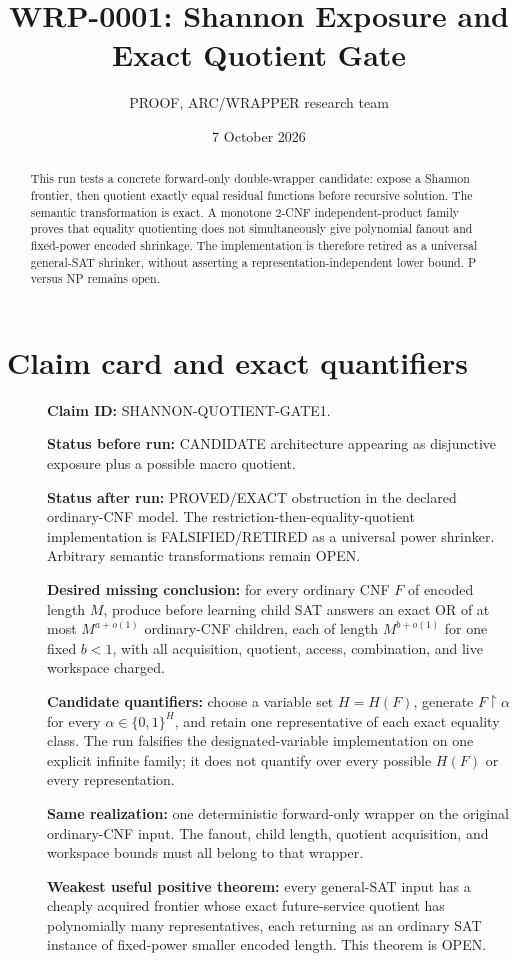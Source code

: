 \documentclass[11pt]{article}
\title{WRP-0001: Shannon Exposure and Exact Quotient Gate}
\author{PROOF, ARC/WRAPPER research team}
\date{7 October 2026}
\begin{document}
\maketitle

\begin{abstract}
This run tests a concrete forward-only double-wrapper candidate: expose a
Shannon frontier, then quotient exactly equal residual functions before
recursive solution.  The semantic transformation is exact.  A monotone
2-CNF independent-product family proves that equality quotienting does not
simultaneously give polynomial fanout and fixed-power encoded shrinkage.
The implementation is therefore retired as a universal general-SAT
shrinker, without asserting a representation-independent lower bound.
P versus NP remains open.
\end{abstract}

\section{Claim card and exact quantifiers}
\begin{description}
\item[] \textbf{Claim ID:} SHANNON-QUOTIENT-GATE1.
\item[] \textbf{Status before run:} CANDIDATE architecture appearing as
disjunctive exposure plus a possible macro quotient.
\item[] \textbf{Status after run:} PROVED/EXACT obstruction in the declared
ordinary-CNF model.  The restriction-then-equality-quotient implementation is
FALSIFIED/RETIRED as a universal power shrinker.  Arbitrary semantic
transformations remain OPEN.
\item[] \textbf{Desired missing conclusion:} for every ordinary CNF $F$ of
encoded length $M$, produce before learning child SAT answers an exact OR of
at most $M^{a+o(1)}$ ordinary-CNF children, each of length
$M^{b+o(1)}$ for one fixed $b<1$, with all acquisition, quotient, access,
combination, and live workspace charged.
\item[] \textbf{Candidate quantifiers:} choose a variable set $H=H(F)$,
generate $F\upharpoonright\alpha$ for every
$\alpha\in\{0,1\}^{H}$, and retain one representative of each exact equality
class.  The run falsifies the designated-variable implementation on one
explicit infinite family; it does not quantify over every possible $H(F)$ or
every representation.
\item[] \textbf{Same realization:} one deterministic forward-only wrapper on
the original ordinary-CNF input.  The fanout, child length, quotient
acquisition, and workspace bounds must all belong to that wrapper.
\item[] \textbf{Weakest useful positive theorem:} every general-SAT input has
a cheaply acquired frontier whose exact future-service quotient has
polynomially many representatives, each returning as an ordinary SAT
instance of fixed-power smaller encoded length.  This theorem is OPEN.
\end{description}
\end{document}
